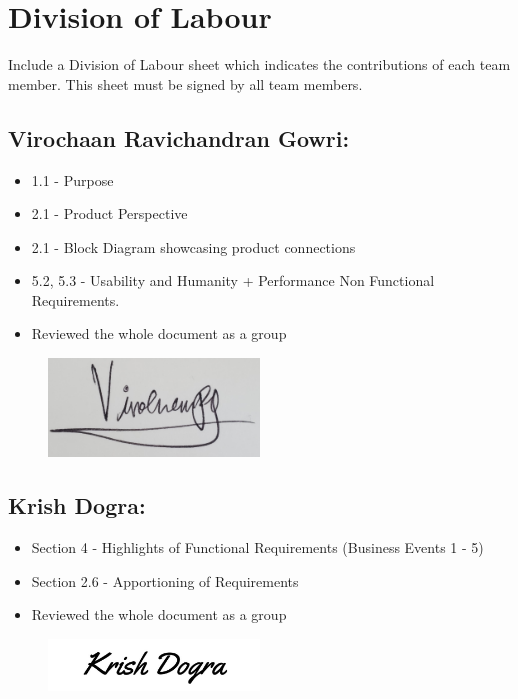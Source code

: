 \documentclass[]{article}
\begin{document}


\appendix
\section{Division of Labour}
\label{sec:division_of_labour}
Include a Division of Labour sheet which indicates the contributions of each team member. This sheet must be signed by all team members.
\subsection*{Virochaan Ravichandran Gowri:}
\begin{itemize}
	\item 1.1 - Purpose
	\item 2.1 - Product Perspective
	\item 2.1 - Block Diagram showcasing product connections
	\item 5.2, 5.3 - Usability and Humanity + Performance Non Functional Requirements.
	\item Reviewed the whole document as a group
\end{itemize}
\begin{figure}[h]
	\centering
	\includegraphics[width=0.5\textwidth]{ViroSignature.jpg}
	\label{fig:signature}
\end{figure}

\subsection*{Krish Dogra:}
\begin{itemize}
	\item Section 4 - Highlights of Functional Requirements (Business Events 1 - 5)
	\item Section 2.6 - Apportioning of Requirements
	\item Reviewed the whole document as a group
\end{itemize}
\begin{figure}[h]
	\centering
	\includegraphics[width=0.5\textwidth]{KrishSignature.jpg}
	\label{fig:signature}
\end{figure}
\end{document}
